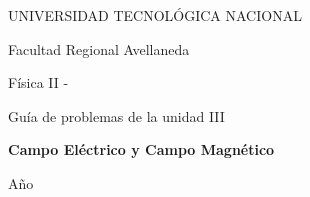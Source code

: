 \begin{titlepage}
\begin{center}
\vspace{1.5cm}


\end{center}

\begin{center}
    {\LARGE UNIVERSIDAD TECNOLÓGICA NACIONAL}\par\medskip
    \vspace*{0.25cm}
    {\LARGE Facultad Regional Avellaneda}\par\medskip
    \vspace*{1cm}
    {\Huge Física II - \comision}\par\medskip
    \vspace*{0.5cm}
    {\LARGE Guía de problemas de la unidad III}\par\bigskip
    \vspace*{1cm}
    {\Huge \bf \color[RGB]{0,121,138} Campo Eléctrico y Campo Magnético\par\medskip}
\end{center}

\vspace{1cm}

\begin{center}
    \begin{minipage}[t]{.7\textwidth}
        \renewcommand*{\contentsname}{Contenidos}
        \tableofcontents
    \end{minipage}
    \vspace*{\fill}
\end{center}
\begin{center}
    Año \anio
\end{center}

\end{titlepage}


